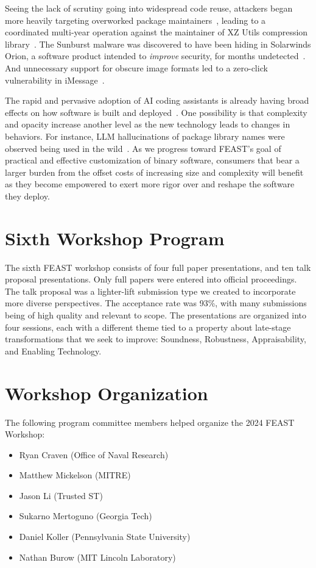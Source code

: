 \documentclass[sigconf]{acmart}
\begin{document}
Seeing the lack of
scrutiny going into widespread code reuse, attackers began more
heavily targeting overworked package maintainers~\cite{duan2021}, leading to a
coordinated multi-year operation against the maintainer of XZ Utils compression
library~\cite{xzutils}. The Sunburst malware was discovered to have been hiding
in Solarwinds Orion, a software product intended to \emph{improve} security, for months undetected~\cite{sunburst}. And
unnecessary support for obscure image formats led to a zero-click vulnerability
in iMessage~\cite{forcedentry}.

The rapid and pervasive adoption of AI coding assistants is already having broad
effects on how software is built and deployed~\cite{klemmer2024}.  One
possibility is that complexity and opacity increase another level as the new technology
leads to changes in behaviors.  For instance, LLM hallucinations of package
library names were observed being used in the wild~\cite{lanyado2024}. As we
progress toward FEAST's goal of practical and effective customization of binary
software, consumers that bear a larger burden from the offset costs of
increasing size and complexity will benefit as they become empowered to exert
more rigor over and reshape the software they deploy.

\section{Sixth Workshop Program}
The sixth FEAST workshop consists of four full paper presentations, and ten talk
proposal presentations.  Only full papers were entered into official proceedings.
The talk proposal was a lighter-lift submission type we created 
to incorporate more diverse perspectives.  The acceptance rate was 93\%,
with many submissions being of high quality and relevant to scope.
The presentations are organized into four sessions, each with a different theme
tied to a property about late-stage transformations that we seek to improve:
Soundness, Robustness, Appraisability, and Enabling Technology.

\section{Workshop Organization}
The following program committee members helped organize the 2024 FEAST Workshop:
\begin{itemize}
  \item Ryan Craven (Office of Naval Research)
  \item Matthew Mickelson (MITRE)
  \item Jason Li (Trusted ST)
  \item Sukarno Mertoguno (Georgia Tech)
  \item Daniel Koller (Pennsylvania State University)
  \item Nathan Burow (MIT Lincoln Laboratory)
\end{itemize}
\end{document}
